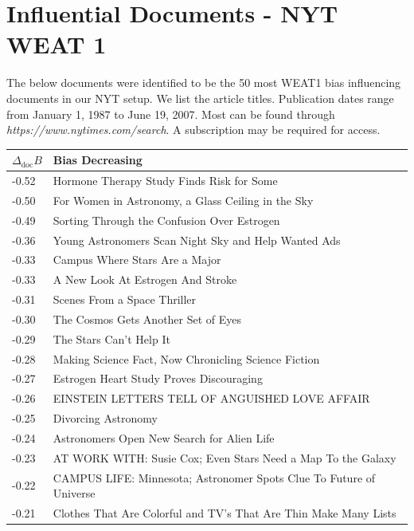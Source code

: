 \documentclass{article}
\begin{document}

\newpage

\section{Influential Documents - NYT WEAT 1}
The below documents were identified to be the 50 most WEAT1 bias influencing documents in our NYT setup. We list the article titles. Publication dates range from January 1, 1987 to June 19, 2007. Most can be found through \textit{https://www.nytimes.com/search}. A subscription may be required for access.

\vfill

\begin{center}


\begin{tabular}{ l p{8cm} }
\toprule
$\Delta_{\text{doc}} B$ & \textbf{Bias Decreasing} \\
\midrule
-0.52	& Hormone Therapy Study Finds Risk for Some \\
-0.50	& For Women in Astronomy, a Glass Ceiling in the Sky \\
-0.49	& Sorting Through the Confusion Over Estrogen \\
-0.36	& Young Astronomers Scan Night Sky and Help Wanted Ads \\
-0.33	& Campus Where Stars Are a Major \\
-0.33	& A New Look At Estrogen And Stroke \\
-0.31	& Scenes From a Space Thriller \\
-0.30	& The Cosmos Gets Another Set of Eyes \\
-0.29	& The Stars Can't Help It \\
-0.28	& Making Science Fact, Now Chronicling Science Fiction \\
-0.27	& Estrogen Heart Study Proves Discouraging \\
-0.26	& EINSTEIN LETTERS TELL OF ANGUISHED LOVE AFFAIR \\
-0.25	& Divorcing Astronomy \\
-0.24	& Astronomers Open New Search for Alien Life \\
-0.23	& AT WORK WITH: Susie Cox; Even Stars Need a Map To the Galaxy \\
-0.22	& CAMPUS LIFE: Minnesota; Astronomer Spots Clue To Future of Universe \\
-0.21	& Clothes That Are Colorful and TV's That Are Thin Make Many Lists \\

\end{tabular}
\end{center}
\end{document}

